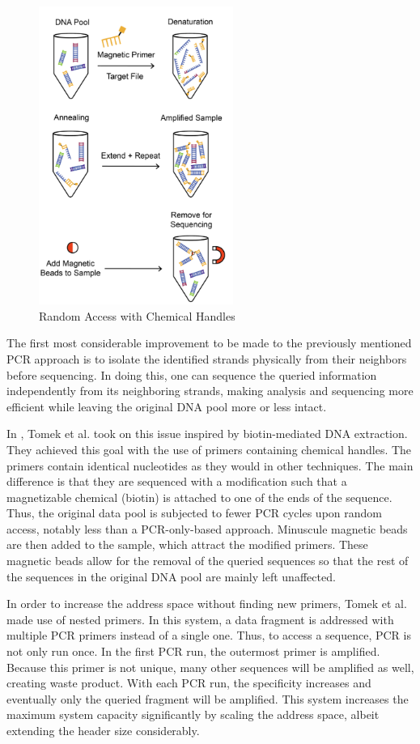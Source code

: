 \documentclass[a4paper,conference]{IEEEtran}
\begin{document}
\begin{figure}[!t]
\centering
\includegraphics[width=2.5in]{images/chemicalhandles}
\caption{Random Access with Chemical Handles}
\label{ch}
\end{figure}

The first most considerable improvement to be made to the previously mentioned PCR approach is to isolate the identified strands physically from their neighbors before sequencing. In doing this, one can sequence the queried information independently from its neighboring strands, making analysis and sequencing more efficient while leaving the original DNA pool more or less intact.

In \cite{tomek_driving_2019}, Tomek et al. took on this issue inspired by biotin-mediated DNA extraction. They achieved this goal with the use of primers containing chemical handles. The primers contain identical nucleotides as they would in other techniques. The main difference is that they are sequenced with a modification such that a magnetizable chemical (biotin) is attached to one of the ends of the sequence. Thus, the original data pool is subjected to fewer PCR cycles upon random access, notably less than a PCR-only-based approach. Minuscule magnetic beads are then added to the sample, which attract the modified primers. These magnetic beads allow for the removal of the queried sequences so that the rest of the sequences in the original DNA pool are mainly left unaffected.

In order to increase the address space without finding new primers, Tomek et al. made use of nested primers. In this system, a data fragment is addressed with multiple PCR primers instead of a single one. Thus, to access a sequence, PCR is not only run once. In the first PCR run, the outermost primer is amplified. Because this primer is not unique, many other sequences will be amplified as well, creating waste product. With each PCR run, the specificity increases and eventually only the queried fragment will be amplified. This system increases the maximum system capacity significantly by scaling the address space\cite{tomek_driving_2019}, albeit extending the header size considerably.
\end{document}
